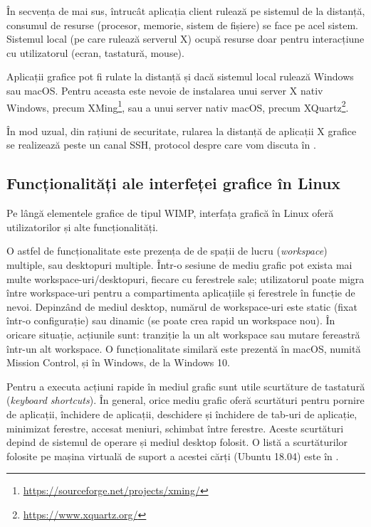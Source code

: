 În secvența de mai sus, întrucât aplicația client rulează pe sistemul de la distanță, consumul de resurse (procesor, memorie, sistem de fișiere) se face pe acel sistem.
Sistemul local (pe care rulează serverul X) ocupă resurse doar pentru interacțiune cu utilizatorul (ecran, tastatură, mouse).

Aplicații grafice pot fi rulate la distanță și dacă sistemul local rulează Windows sau macOS.
Pentru aceasta este nevoie de instalarea unui server X nativ Windows, precum XMing\footnote{\url{https://sourceforge.net/projects/xming/}}, sau a unui server nativ macOS, precum XQuartz\footnote{\url{https://www.xquartz.org/}}.

În mod uzual, din rațiuni de securitate, rularea la distanță de aplicații X grafice se realizează peste un canal SSH, protocol despre care vom discuta în .

\subsection{Funcționalități ale interfeței grafice în Linux}
\label{sec:ui:linux-gui-features}

Pe lângă elementele grafice de tipul WIMP, interfața grafică în Linux oferă utilizatorilor și alte funcționalități.

O astfel de funcționalitate este prezența de de spații de lucru (\textit{workspace}) multiple, sau desktopuri multiple.
Într-o sesiune de mediu grafic pot exista mai multe workspace-uri/desktopuri, fiecare cu ferestrele sale;
utilizatorul poate migra între workspace-uri pentru a compartimenta aplicațiile și ferestrele în funcție de nevoi.
Depinzând de mediul desktop, numărul de workspace-uri este static (fixat într-o configurație) sau dinamic (se poate crea rapid un workspace nou).
În oricare situație, acțiunile sunt: tranziție la un alt workspace sau mutare fereastră într-un alt workspace.
O funcționalitate similară este prezentă în macOS, numită Mission Control, și în Windows, de la Windows 10.

Pentru a executa acțiuni rapide în mediul grafic sunt utile scurtăture de tastatură (\textit{keyboard shortcuts}).
În general, orice mediu grafic oferă scurtături pentru pornire de aplicații, închidere de aplicații, deschidere și închidere de tab-uri de aplicație, minimizat ferestre, accesat meniuri, schimbat între ferestre.
Aceste scurtături depind de sistemul de operare și mediul desktop folosit.
O listă a scurtăturilor folosite pe mașina virtuală de suport a acestei cărți (Ubuntu 18.04) este în .

